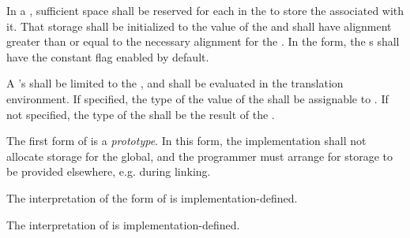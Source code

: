 \specsubsubitem
In a , sufficient space shall be reserved for
each  in the  to store
the  associated with it. That storage shall be initialized to
the value of the  and shall have alignment greater than
or equal to the necessary alignment for the . In the
 form, the s shall have the constant flag
enabled by default.

\specsubsubitem
A 's  shall be limited to
the , and shall be evaluated
in the translation environment. If specified, the type of the value of the
 shall be assignable to . If not
specified, the type of the  shall be the result
of the .

\specsubsubitem
The first form of  is a \textit{prototype}. In this
form, the implementation shall not allocate storage for the global, and the
programmer must arrange for storage to be provided elsewhere, e.g. during linking.

\specsubsubitem
The interpretation of the  form of  is
implementation-defined.


\specsubsubitem
The interpretation of  is implementation-defined.



\begin{grammar}
 \\
	  \\

 \\
	 \optional{\terminal{,}} \\
	 \terminal{,}  \\

 \\
	 \terminal{:}  \terminal{=}  \\
\end{grammar}

